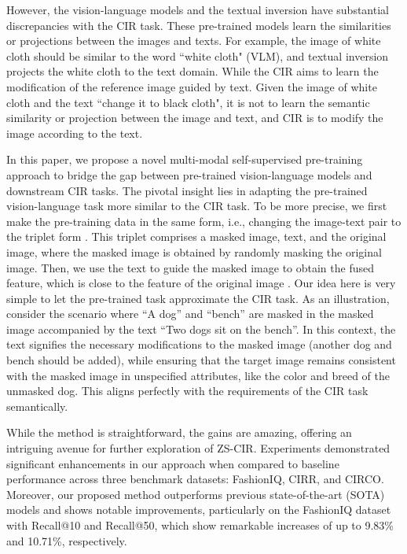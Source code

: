 \documentclass[10pt,twocolumn,letterpaper]{article}
\begin{document}
However, the vision-language models and the textual inversion have substantial discrepancies with the CIR task. These pre-trained models learn the similarities or projections between the images and texts. For example, the image of white cloth should be similar to the word ``white cloth" (VLM), and textual inversion projects the white cloth to the text domain. While the CIR aims to learn the modification of the reference image guided by text. Given the image of white cloth and the text ``change it to black cloth", it is not to learn the semantic similarity or projection between the image and text, and CIR is to modify the image according to the text. 

In this paper, we propose a novel multi-modal self-supervised pre-training approach to bridge the gap between pre-trained vision-language models and downstream CIR tasks. The pivotal insight lies in adapting the pre-trained vision-language task more similar to the CIR task. To be more precise, we first make the pre-training data in the same form, i.e., changing the image-text pair   to the triplet form  . This triplet comprises a masked image, text, and the original image, where the masked image is obtained by randomly masking the original image. Then, we use the text  to guide the masked image  to obtain the fused feature, which is close to the feature of the original image . Our idea here is very simple to let the pre-trained task approximate the CIR task. As an illustration, consider the scenario where ``A dog'' and ``bench'' are masked in the masked image  accompanied by the text ``Two dogs sit on the bench''. In this context, the text signifies the necessary modifications to the masked image  (another dog and bench should be added), while ensuring that the target image  remains consistent with the masked image in unspecified attributes, like the color and breed of the unmasked dog. This aligns perfectly with the requirements of the CIR task semantically. 

While the method is straightforward, the gains are amazing, offering an intriguing avenue for further exploration of ZS-CIR. Experiments demonstrated significant enhancements in our approach when compared to baseline performance across three benchmark datasets: FashionIQ, CIRR, and CIRCO. Moreover, our proposed method outperforms previous state-of-the-art (SOTA) models and shows notable improvements, particularly on the FashionIQ dataset with Recall@10 and Recall@50, which show remarkable increases of up to 9.83\% and 10.71\%, respectively.
\end{document}
